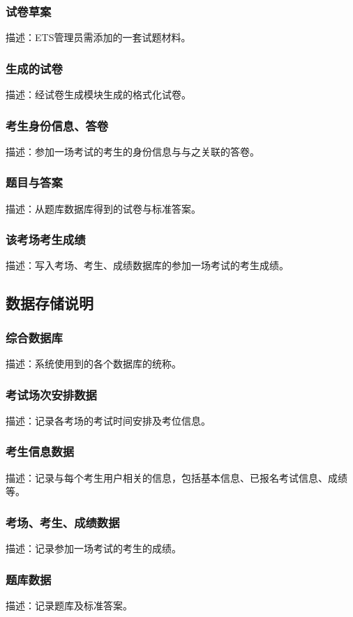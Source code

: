 \subsubsection{试卷草案}
描述：ETS管理员需添加的一套试题材料。
\subsubsection{生成的试卷}
描述：经试卷生成模块生成的格式化试卷。
\subsubsection{考生身份信息、答卷}
描述：参加一场考试的考生的身份信息与与之关联的答卷。
\subsubsection{题目与答案}
描述：从题库数据库得到的试卷与标准答案。
\subsubsection{该考场考生成绩}
描述：写入考场、考生、成绩数据库的参加一场考试的考生成绩。


\subsection{数据存储说明}
\subsubsection{综合数据库}
描述：系统使用到的各个数据库的统称。

\subsubsection{考试场次安排数据}
描述：记录各考场的考试时间安排及考位信息。
\subsubsection{考生信息数据}
描述：记录与每个考生用户相关的信息，包括基本信息、已报名考试信息、成绩等。
\subsubsection{考场、考生、成绩数据}
描述：记录参加一场考试的考生的成绩。
\subsubsection{题库数据}
描述：记录题库及标准答案。


